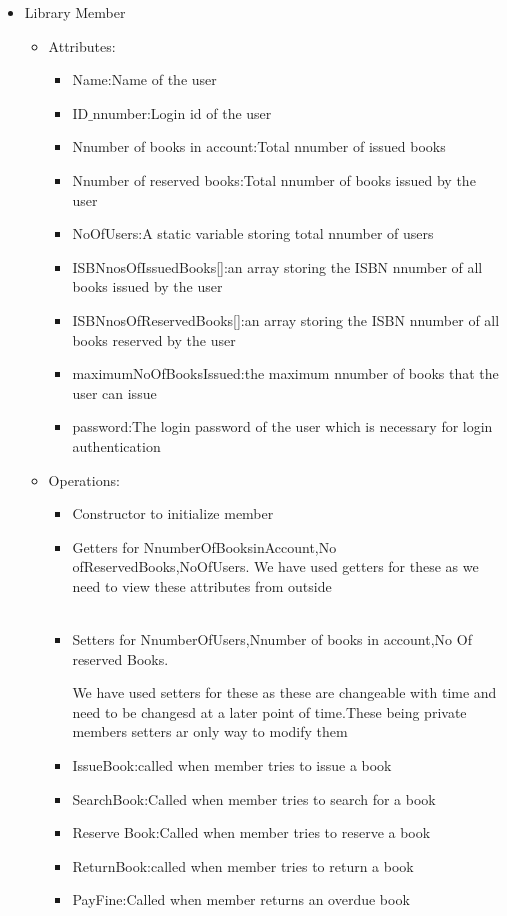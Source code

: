 \documentclass[a4paper]{article}
\begin{document}
\begin{itemize}
\item Library Member 
\begin{itemize}
\item Attributes:
\begin{itemize}
\item Name:Name of the user
\item ID$\_$nnumber:Login id of the user
\item Nnumber of books in account:Total nnumber of issued books
\item Nnumber of reserved books:Total nnumber of books issued by the user
\item NoOfUsers:A static variable storing total nnumber of users
\item ISBNnosOfIssuedBooks[]:an array storing the ISBN nnumber of all books issued by the user
\item ISBNnosOfReservedBooks[]:an array storing the ISBN nnumber of all books reserved by the user
\item maximumNoOfBooksIssued:the maximum nnumber of books that the user can issue
\item password:The login password of the user which is necessary for login authentication
\end{itemize}

\item Operations:
\begin{itemize}

\item Constructor to initialize member\\
\item Getters for NnumberOfBooksinAccount,No ofReservedBooks,NoOfUsers.
We have used getters for these as we need to view these attributes from outside \\\
\item Setters for NnumberOfUsers,Nnumber of books in account,No Of reserved Books.


We have used setters for these as these are changeable with time and need to be changesd at a later point of time.These being private members setters ar only way to modify them
\\
\item IssueBook:called when member tries to issue a book\\
\item SearchBook:Called when member tries to search for a book\\
\item Reserve Book:Called when member tries to reserve a book\\
\item ReturnBook:called when member tries to return a book\\
\item PayFine:Called when member returns an overdue book\\


\end{itemize}
\end{itemize}
\end{itemize}
\end{document}
